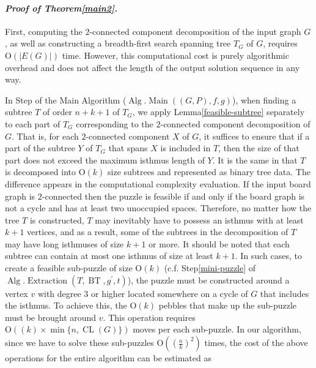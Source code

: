 \documentclass[letter,11pt]{article}
\newcommand{\white}{\qquad{\framebox{\rule{0pt}{4pt}}}}
\newcommand{\owari}{\hfill\white}
\theoremstyle{definition}
\theoremstyle{definition}
\DeclareMathOperator{\BT}{BT}
\DeclareMathOperator{\Alg}{Alg}
\DeclareMathOperator{\Extraction}{Extraction}
\DeclareMathOperator{\Main}{Main}
\DeclareMathOperator{\CL}{CL}
\newcommand{\1}{\boldmath$~1~$\unboldmath}
\newcommand{\Ord}{\mathrm{O}}
\newcommand{\qedgo}{\vspace{0.35cm}}
\newcommand{\tume}{\hspace*{0.2em}}
\newcommand{\maru}[1]{{\ooalign{\hfill$\small#1$\hfill\crcr\scalebox{1.3}{$\bigcirc$}}}}
\newenvironment{Proofof}[1]{\expandafter
\paragraph{{\it Proof of #1.}}}{\hspace{5mm}\owari\qedgo}
\begin{document}
\begin{Proofof}{Theorem\tume\ref{main2}}
First, computing the $2$-connected component decomposition of the input graph $G$, as well as 
constructing a breadth-first search spanning tree $T_G$ of $G$, requires 
$\Ord(|E(G)|)$ time. 
However, this computational cost is purely algorithmic overhead and does not affect the length of 
the output solution sequence in any way.

In Step\tume\maru{1} of the Main Algorithm ($\Alg.\Main((G, P), f, g)$), when finding a subtree $T$ 
of order $n + k + 1$ of $T_G$, we apply Lemma\tume\ref{feasible-subtree} separately to each part of $T_G$ 
corresponding to the $2$-connected component decomposition of $G$. 
That is, for each $2$-connected component $X$ of $G$, it suffices to ensure that if a part of the subtree $Y$ 
of $T_G$ that spans $X$ is included in $T$, then the size of that part does not exceed the maximum isthmus 
length of $Y$.
It is the same in that $T$ is decomposed into $\Ord(k)$ size subtrees and represented as binary tree data. 
The difference appears in the computational complexity evaluation. 
If the input board graph is $2$-connected then the puzzle is feasible if and only if the board graph is 
not a cycle and has at least two unoccupied spaces. Therefore, no matter how the tree $T$ is 
constructed, $T$ may inevitably have to possess an isthmus with at least $k+1$ vertices, 
and as a result, some of the subtrees in the decomposition of $T$ may have long isthmuses of size
$k+1$ or more. It should be noted that each subtree can contain at most one isthmus of size 
at least $k+1$. In such cases, to create a feasible sub-puzzle of size $\Ord(k)$
(c.f. Step\tume\ref{mini-puzzle} of $\Alg.\Extraction(T, \BT,g^{\prime},t)$), 
the puzzle must be constructed around a vertex $v$ with degree $3$ or higher located somewhere 
on a cycle of $G$ that includes the isthmus. To achieve this, the $\Ord(k)$ pebbles that make up 
the sub-puzzle must be brought around $v$. This operation requires $\Ord((k)\times \min\{n,\CL(G)\})$
moves per each sub-puzzle.
In our algorithm, since we have to solve these sub-puzzles $\Ord((\frac{n}{k})^2)$ times, 
the cost of the above operations for the entire algorithm can be estimated as 

\end{Proofof}
\end{document}

